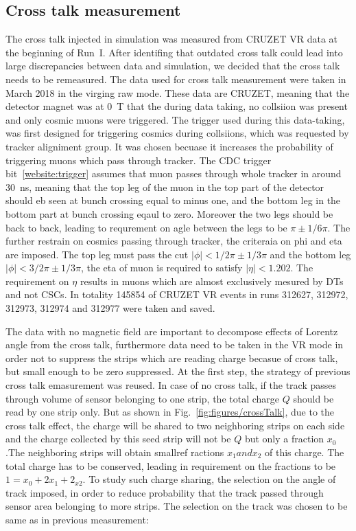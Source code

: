 \subsection{Cross talk  measurement~\label{sec:xtalk}}

The cross talk injected in simulation was measured from CRUZET VR data at the beginning of Run~I. After identifing that outdated cross talk could lead into large discrepancies between data and simulation, we decided that the cross talk needs to be remeasured. The data used for cross talk measurement were taken in March 2018 in the virging raw mode. These data are CRUZET, meaning that the detector magnet was at 0~T that the during data taking, no collsiion was present and only cosmic muons were triggered. The trigger used during this data-taking, was first designed for triggering cosmics during collsiions, which was requested by tracker aligniment group. It was chosen becuase it increases the probability of triggering muons which pass through tracker. The CDC trigger bit~\ref{website:trigger} assumes that muon passes through whole tracker in around 30~ns, meaning that the top leg of the muon in the top part of the detector should eb seen at bunch crossing equal to minus one, and the bottom leg in the bottom part at bunch crossing eqaul to zero. Moreover the two legs should be back to back, leading to requrement on agle between the legs to be $\pi \pm 1/6\pi$. The further restrain on cosmics passing through tracker, the criteraia on phi and eta are imposed. The top leg must pass the cut $|\phi|<1/2\pi \pm 1/3\pi$ and the bottom leg $|\phi|<3/2\pi \pm 1/3\pi$, the eta of muon is required to satisfy $|\eta|<1.202$. The requirement on $\eta$ results in muons which are almost exclusively mesured by DTs and not CSCs. In totality 145854 of CRUZET VR events in runs 312627, 312972, 312973, 312974 and 312977 were taken and saved.

The data with no magnetic field are important to decompose effects of Lorentz angle from the cross talk, furthermore data need to be taken in the VR mode in order not to suppress the strips which are reading charge becasue of cross talk, but small enough to be zero suppressed. At the first step, the strategy of previous cross talk emasurement was reused. In case of no cross talk, if the track passes through volume of sensor belonging to one strip, the total charge $Q$ should be read by one strip only. But as shown in Fig.~\ref{fig:figures/crossTalk}, due to the cross talk effect, the charge will be shared to two neighboring strips on each side and the charge collected by this seed strip will not be $Q$ but only a fraction $x_{0}$.The neighboring strips will obtain smallref ractions $x_{1} and x_{2}$ of this charge. The total charge has to be conserved, leading in requirement on the fractions to be $1=x_{0}+2x_{1}+2_{x2}$. To study such charge sharing, the selection on the angle of track imposed, in order to reduce probability that the track passed through sensor area belonging to more strips. The selection on the track was chosen to be same as in previous measurement:

